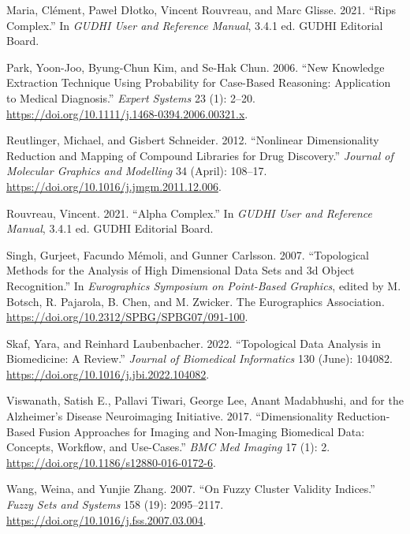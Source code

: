 \documentclass{article}
\newlength{\cslhangindent}
\newlength{\cslentryspacingunit} %
\newenvironment{CSLReferences}[2] %
 {%
  \setlength{\parindent}{0pt}
  \ifodd #1
  \let\oldpar\par
  \def\par{\hangindent=\cslhangindent\oldpar}
  \fi
  \setlength{\parskip}{#2\cslentryspacingunit}
 }%
 {}
\begin{document}
\begin{CSLReferences}{1}{0}
\leavevmode{}%
Maria, Clément, Paweł Dłotko, Vincent Rouvreau, and Marc Glisse. 2021.
{``Rips Complex.''} In \emph{{GUDHI User} and {Reference Manual}}, 3.4.1
ed. {GUDHI Editorial Board}.

\leavevmode{}%
Park, Yoon-Joo, Byung-Chun Kim, and Se-Hak Chun. 2006. {``New Knowledge
Extraction Technique Using Probability for Case-Based Reasoning:
Application to Medical Diagnosis.''} \emph{Expert Systems} 23 (1):
2--20. \url{https://doi.org/10.1111/j.1468-0394.2006.00321.x}.

\leavevmode{}%
Reutlinger, Michael, and Gisbert Schneider. 2012. {``Nonlinear
Dimensionality Reduction and Mapping of Compound Libraries for Drug
Discovery.''} \emph{Journal of Molecular Graphics and Modelling} 34
(April): 108--17. \url{https://doi.org/10.1016/j.jmgm.2011.12.006}.

\leavevmode{}%
Rouvreau, Vincent. 2021. {``Alpha Complex.''} In \emph{{GUDHI User} and
{Reference Manual}}, 3.4.1 ed. {GUDHI Editorial Board}.

\leavevmode{}%
Singh, Gurjeet, Facundo Mémoli, and Gunner Carlsson. 2007.
{``Topological {Methods} for the {Analysis} of {High Dimensional Data
Sets} and {3d Object Recognition}.''} In \emph{Eurographics {Symposium}
on {Point-Based Graphics}}, edited by M. Botsch, R. Pajarola, B. Chen,
and M. Zwicker. {The Eurographics Association}.
\url{https://doi.org/10.2312/SPBG/SPBG07/091-100}.

\leavevmode{}%
Skaf, Yara, and Reinhard Laubenbacher. 2022. {``Topological Data
Analysis in Biomedicine: {A} Review.''} \emph{Journal of Biomedical
Informatics} 130 (June): 104082.
\url{https://doi.org/10.1016/j.jbi.2022.104082}.

\leavevmode{}%
Viswanath, Satish E., Pallavi Tiwari, George Lee, Anant Madabhushi, and
for the Alzheimer's Disease Neuroimaging Initiative. 2017.
{``Dimensionality Reduction-Based Fusion Approaches for Imaging and
Non-Imaging Biomedical Data: Concepts, Workflow, and Use-Cases.''}
\emph{BMC Med Imaging} 17 (1): 2.
\url{https://doi.org/10.1186/s12880-016-0172-6}.

\leavevmode{}%
Wang, Weina, and Yunjie Zhang. 2007. {``On Fuzzy Cluster Validity
Indices.''} \emph{Fuzzy Sets and Systems} 158 (19): 2095--2117.
\url{https://doi.org/10.1016/j.fss.2007.03.004}.


\end{CSLReferences}
\end{document}
